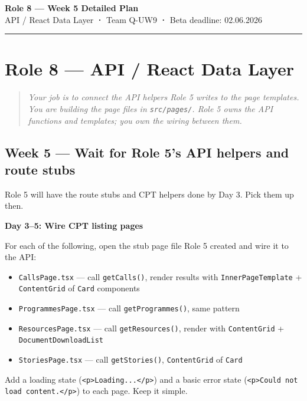 \documentclass[11pt,a4paper]{article}
\begin{document}
\begin{center}
    {\Large\bfseries\color{uvtBlue} Role 8 — Week 5 Detailed Plan}\\[0.4em]
    {\small API / React Data Layer \textbf{·} Team Q-UW9 \textbf{·} Beta deadline: 02.06.2026}
\end{center}
\vspace{0.3em}
\textcolor{uvtYellow}{\rule{\linewidth}{2pt}}
\vspace{0.8em}
\section{Role 8 — API / React Data Layer}

\begin{quote}\itshape
Your job is to connect the API helpers Role 5 writes to the page templates. You are building the page files in \nolinkurl{src/pages/}. Role 5 owns the API functions and templates; you own the wiring between them.
\end{quote}

\subsection{Week 5 — Wait for Role 5's API helpers and route stubs}

Role 5 will have the route stubs and CPT helpers done by Day 3. Pick them up then.

\textbf{Day 3–5: Wire CPT listing pages}

For each of the following, open the stub page file Role 5 created and wire it to the API:

\begin{itemize}
\item \nolinkurl{CallsPage.tsx} — call \nolinkurl{getCalls()}, render results with \nolinkurl{InnerPageTemplate} + \nolinkurl{ContentGrid} of \nolinkurl{Card} components
\item \nolinkurl{ProgrammesPage.tsx} — call \nolinkurl{getProgrammes()}, same pattern
\item \nolinkurl{ResourcesPage.tsx} — call \nolinkurl{getResources()}, render with \nolinkurl{ContentGrid} + \nolinkurl{DocumentDownloadList}
\item \nolinkurl{StoriesPage.tsx} — call \nolinkurl{getStories()}, \nolinkurl{ContentGrid} of \nolinkurl{Card}
\end{itemize}

Add a loading state (\nolinkurl{<p>Loading...</p>}) and a basic error state (\nolinkurl{<p>Could not load content.</p>}) to each page. Keep it simple.
\end{document}
